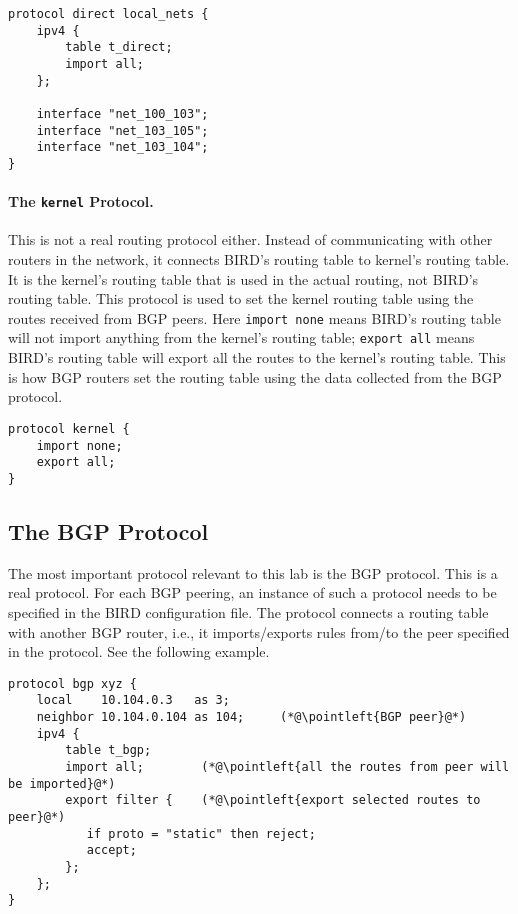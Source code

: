 \begin{lstlisting}
protocol direct local_nets {
    ipv4 {
        table t_direct;
        import all;
    };

    interface "net_100_103";
    interface "net_103_105";
    interface "net_103_104";
}
\end{lstlisting}


\paragraph{The \texttt{kernel} Protocol.} 
This is not a real routing protocol either.
Instead of communicating with other routers in the network, it connects
BIRD's routing table to kernel's routing table. It is the kernel's routing table
that is used in the actual routing, not BIRD's routing table.
This protocol is used to set the kernel routing table using the routes
received from BGP peers. Here
\texttt{import none} means BIRD's routing table will not import anything from
the kernel's routing table; \texttt{export all} means BIRD's routing table
will export all the routes to the kernel's routing table. This is how BGP
routers set the routing table using the data collected from the BGP
protocol.

\begin{lstlisting}
protocol kernel {
    import none;
    export all;
}
\end{lstlisting}



\subsection{The BGP Protocol} 

The most important protocol relevant to this lab is the BGP protocol.
This is a real protocol. For each BGP peering, an instance of 
such a protocol needs to be specified in the BIRD configuration 
file. The protocol connects a routing table with another 
BGP router, i.e., it imports/exports rules from/to 
the peer specified in the protocol.
See the following example. 

\begin{lstlisting}
protocol bgp xyz {
    local    10.104.0.3   as 3;
    neighbor 10.104.0.104 as 104;     (*@\pointleft{BGP peer}@*)
    ipv4 {
        table t_bgp;
        import all;        (*@\pointleft{all the routes from peer will be imported}@*)
        export filter {    (*@\pointleft{export selected routes to peer}@*)
           if proto = "static" then reject;
           accept;
        };
    };
}
\end{lstlisting}

